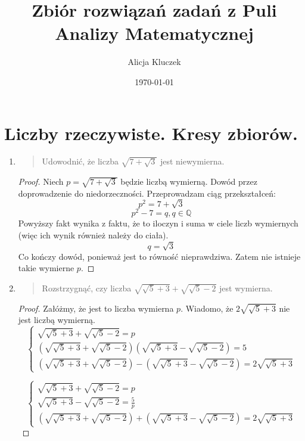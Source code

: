 \documentclass{article}
\begin{document}
\title{Zbiór rozwiązań zadań z Puli Analizy Matematycznej}
\author{Alicja Kluczek}
\date{\today}
\maketitle
\newpage
\section{Liczby rzeczywiste. Kresy zbiorów.}

\begin{enumerate}

\item
\begin{quote}
    Udowodnić, że liczba $\sqrt{7 + \sqrt{3}}$ jest
    niewymierna.
\end{quote}
\begin{proof}
    Niech $p = \sqrt{7 + \sqrt{3}}$ będzie
    liczbą wymierną. Dowód przez doprowadzenie do
    niedorzeczności.
    Przeprowadzam ciąg przekształceń:
    $$ p^2 = 7 + \sqrt{3} $$
    $$ p^2 - 7 = q, q \in \mathbb{Q} $$
    Powyższy fakt wynika z faktu, że to iloczyn i suma
    w ciele liczb wymiernych (więc ich wynik również należy do ciała).
    $$ q = \sqrt{3} $$
    Co kończy dowód, ponieważ jest to równość nieprawdziwa.
    Zatem nie istnieje takie wymierne $p$.
\end{proof}
\item \begin{quote}
    Rozstrzygnąć, czy liczba $\sqrt{\sqrt{5} + 3} + \sqrt{\sqrt{5} - 2}$
    jest wymierna.
\end{quote}
\begin{proof}
    Załóżmy, że jest to liczba wymierna $p$.
    Wiadomo, że $2 \sqrt{\sqrt{5} + 3}$ nie jest liczbą wymierną.
    $$
    \left\{ \begin{array}{ll}
        \sqrt{\sqrt{5} + 3} + \sqrt{\sqrt{5} - 2} = p\\
        (\sqrt{\sqrt{5} + 3} + \sqrt{\sqrt{5} - 2})(\sqrt{\sqrt{5} + 3}
         - \sqrt{\sqrt{5} - 2}) = 5\\
        (\sqrt{\sqrt{5} + 3} + \sqrt{\sqrt{5} - 2}) -
        (\sqrt{\sqrt{5} + 3} - \sqrt{\sqrt{5} - 2}) = 2 \sqrt{\sqrt{5} + 3}
    \end{array} \right.
    $$

    $$
    \left\{ \begin{array}{ll}
        \sqrt{\sqrt{5} + 3} + \sqrt{\sqrt{5} - 2} = p\\
        \sqrt{\sqrt{5} + 3} - \sqrt{\sqrt{5} - 2} = \frac{5}{p}\\
        (\sqrt{\sqrt{5} + 3} + \sqrt{\sqrt{5} - 2}) +
        (\sqrt{\sqrt{5} + 3} - \sqrt{\sqrt{5} - 2}) = 2 \sqrt{\sqrt{5} + 3}
    \end{array} \right.
    $$


\end{proof}
\end{enumerate}
\end{document}
